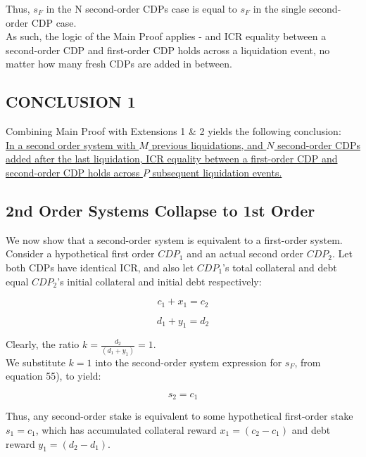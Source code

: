 \documentclass[reqno]{article}
\begin{document}
Thus, $s_F$ in the N second-order CDPs case is equal to $s_F$ in the single second-order CDP case.\\

As such, the logic of the Main Proof applies - and ICR equality between a second-order CDP and first-order CDP holds across a liquidation event, no matter how many fresh CDPs are added in between.

\subsection{CONCLUSION 1}

\bigskip
Combining Main Proof with Extensions 1 \& 2 yields the following conclusion:\\

\uline{In a second order system with $M$ previous liquidations, and $N$ second-order CDPs added after the last liquidation, ICR equality between a first-order CDP and second-order CDP holds across $P$ subsequent liquidation events.}\\

\subsection{2nd Order Systems Collapse to 1st Order}
We now show that a second-order system is equivalent to a first-order system.\\

Consider a hypothetical first order $CDP_1$ and an actual second order $CDP_2$. Let both CDPs have identical ICR, and also let $CDP_1$’s total collateral and debt equal $CDP_2$’s initial collateral and initial debt respectively:

\begin{equation} 
    c_1+x_1=c_2
\end{equation}

\begin{equation} 
    d_1+y_1=d_2
\end{equation}

\bigskip
Clearly, the ratio  $k = \frac{d_2}{(d_1+y_1)} = 1$.\\

We substitute $k=1$ into the second-order system expression for $s_F$, from equation 55), to yield:

\begin{equation} 
    s_2=c_1
\end{equation}

\bigskip
Thus, any second-order stake is equivalent to some hypothetical first-order stake $s_1=c_1$, which has accumulated collateral reward $x_1=(c_2-c_1)$ and debt reward $y_1=(d_2-d_1)$.\\
\end{document}
